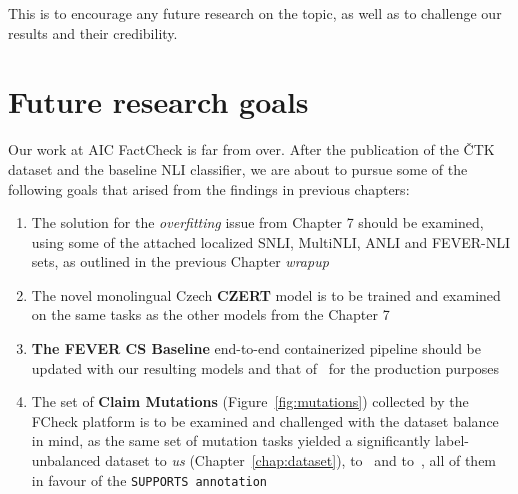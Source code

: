 This is to encourage any future research on the topic, as well as to challenge our results and their credibility.

\section{Future research goals}
Our work at \textsf{AIC FactCheck} is far from over. After the publication of the \textsf{ČTK} dataset and the baseline NLI classifier, we are about to pursue some of the following goals that arised from the findings in previous chapters:

\begin{enumerate}
    \item The solution for the \textit{overfitting} issue from Chapter 7 should be examined, using some of the attached localized \textsf{SNLI},  \textsf{MultiNLI},  \textsf{ANLI}  and \textsf{FEVER-NLI} sets, as outlined in the previous Chapter \textit{wrapup}
    \item The novel monolingual Czech \textbf{\textsf{CZERT}} model is to be trained and examined on the same tasks as the other models from the Chapter 7
    \item \textbf{\textsf{The FEVER CS Baseline}} end-to-end containerized pipeline should be updated with our resulting models and that of~\cite{rypar} for the production purposes
    \item The set of \tdvab{} \textbf{\textsf{Claim Mutations}} (Figure~\ref{fig:mutations}) collected by the \textsf{FCheck} platform is to be examined and challenged with the dataset balance in mind, as the same set of mutation tasks yielded a significantly label-unbalanced dataset to \textit{us} (Chapter~\ref{chap:dataset}), to~\cite{fever} and to~\cite{danish}, all of them in favour of the \texttt{SUPPORTS annotation}
\end{enumerate}
